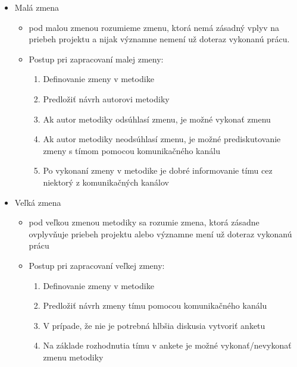 \documentclass{article}
\begin{document}
        \begin{itemize}
            \item Malá zmena
            \begin{itemize}
                \item pod malou zmenou rozumieme zmenu, ktorá nemá zásadný vplyv na priebeh projektu a nijak významne nemení už doteraz vykonanú prácu.
                \item Postup pri zapracovaní malej zmeny:
                \begin{enumerate}
                    \item Definovanie zmeny v metodike
                    \item Predložiť návrh autorovi metodiky
                    \item Ak autor metodiky odsúhlasí zmenu, je možné vykonať zmenu
                    \item Ak autor metodiky neodsúhlasí zmenu, je možné prediskutovanie zmeny s tímom pomocou komunikačného kanálu
                    \item Po vykonaní zmeny v metodike je dobré informovanie tímu cez niektorý z komunikačných kanálov
                \end{enumerate}
            \end{itemize}

            \item Veľká zmena
            \begin{itemize}
                \item pod veľkou zmenou metodiky sa rozumie zmena, ktorá zásadne ovplyvňuje priebeh projektu alebo významne mení už doteraz vykonanú prácu
                \item Postup pri zapracovaní veľkej zmeny:
                \begin{enumerate}
                    \item Definovanie zmeny v metodike
                    \item Predložiť návrh zmeny tímu pomocou komunikačného kanálu
                    \item V prípade, že nie je potrebná hlbšia diskusia vytvoriť anketu
                    \item Na základe rozhodnutia tímu v ankete je možné vykonať/nevykonať zmenu metodiky
                \end{enumerate}
            \end{itemize}
        \end{itemize}
\end{document}
